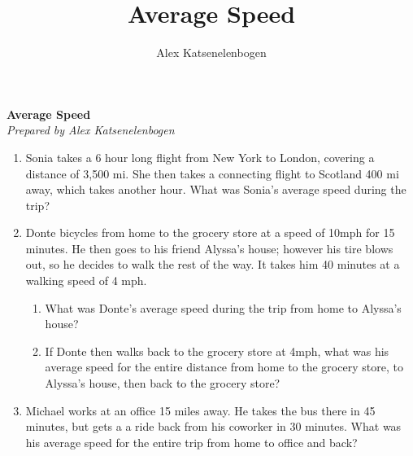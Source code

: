 \documentclass{article}
\title{Average Speed}
\author{Alex Katsenelenbogen}
\begin{document}
\begin{center}
      \Large\textbf{Average Speed}\\
      \large\textit{Prepared by Alex Katsenelenbogen}
   \end{center}

\begin{enumerate}

\item Sonia takes a 6 hour long flight from New York to London, covering a distance of 3,500 mi. She then takes a connecting flight to Scotland 400 mi away, which takes another hour.  What was Sonia's average speed during the trip?

\item Donte bicycles from home to the grocery store at a speed of 10mph for 15 minutes. He then goes to his friend Alyssa's house; however his tire blows out, so he decides to walk the rest of the way. It  takes him 40 minutes at a walking speed of 4 mph.
\begin{enumerate}
\item What was Donte's average speed during the trip from home to Alyssa's house?
\item If Donte then walks back to the grocery store at 4mph, what was his average speed for the entire distance from home to the grocery store, to Alyssa's house, then back to the grocery store?
\end{enumerate} 
\item Michael works at an office 15 miles away. He takes the bus there in 45 minutes, but gets a a ride back from his coworker in 30 minutes. What was his average speed for the entire trip from home to office and back?
\end{enumerate}
\end{document}

